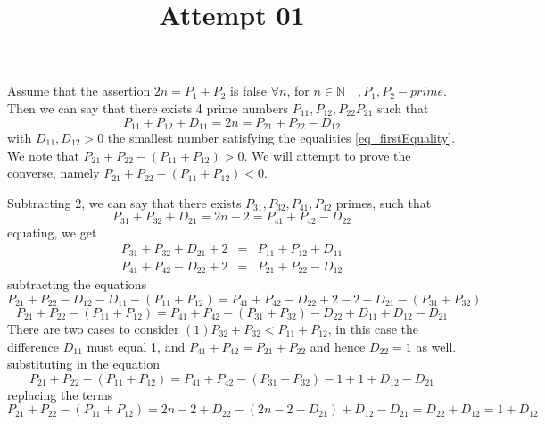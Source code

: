 \documentclass{report}
\begin{document}
\title{Attempt 01}
\maketitle 
Assume that the assertion $2n=P_1+P_2$ is false $\forall n$, for $n\in\mathbb{N}\quad, P_1,P_2-prime$. Then we can say that there exists 4 prime numbers $P_{11},P_{12},P_{22} P_{21}$ such that 
\begin{equation}\label{eq_firstEquality}
P_{11}+P_{12}+D_{11}=2n=P_{21}+P_{22}-D_{12}
\end{equation}
with $D_{11},D_{12}>0$ the smallest number satisfying the equalities \ref{eq_firstEquality}. 
We note that $P_{21}+P_{22}-(P_{11}+P_{12})>0$. We will attempt to prove the converse, namely $P_{21}+P_{22}-(P_{11}+P_{12})<0$.

Subtracting 2, we can say that there exists $P_{31},P_{32},P_{41},P_{42}$ primes, such that 
\begin{equation}
P_{31}+P_{32}+D_{21}=2n-2=P_{41}+P_{42}-D_{22}
\end{equation}
equating, we get 
\begin{eqnarray}
P_{31}+P_{32}+D_{21}+2 &=& P_{11}+P_{12}+D_{11}\\
P_{41}+P_{42}-D_{22}+2 &=& P_{21}+P_{22}-D_{12}
\end{eqnarray}
subtracting the equations 
\begin{equation}
P_{21}+P_{22}-D_{12}-D_{11}-(P_{11}+P_{12})=P_{41}+P_{42}-D_{22}+2-2-D_{21}-(P_{31}+P_{32})
\end{equation}
\begin{equation}
P_{21}+P_{22}-(P_{11}+P_{12})= P_{41}+P_{42}-(P_{31}+P_{32})-D_{22}+D_{11}+D_{12}-D_{21}
\end{equation}
There are two cases to consider $(1)P_{32}+P_{32}<P_{11}+P_{12}$, in this case the difference $D_{11}$ must equal 1, and $P_{41}+P_{42}=P_{21}+P_{22}$ and hence $D_{22}=1$ as well. substituting in the equation
\begin{equation}
P_{21}+P_{22}-(P_{11}+P_{12})= P_{41}+P_{42}-(P_{31}+P_{32})-1+1+D_{12}-D_{21}
\end{equation}
replacing the terms 
\begin{equation*}
P_{21}+P_{22}-(P_{11}+P_{12})=2n-2+D_{22}-(2n-2 -D_{21})+D_{12}-D_{21}=D_{22}+D_{12}=1+D_{12}
\end{equation*}
\end{document}
